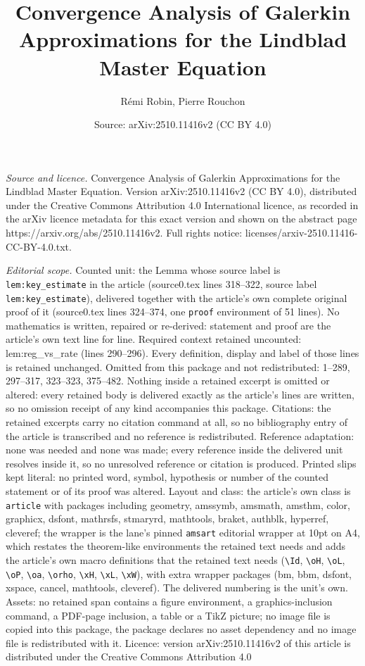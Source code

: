 \documentclass[10pt,a4paper]{amsart}
\title[Convergence Analysis of Galerkin Approximations for the Lind]{Convergence Analysis of Galerkin Approximations for the Lindblad Master Equation}
\author{R\'emi Robin, Pierre Rouchon}
\date{Source: arXiv:2510.11416v2 (CC BY 4.0)}
\begin{document}
\maketitle

\noindent\emph{Source and licence.} Convergence Analysis of Galerkin Approximations for the Lindblad Master Equation. Version arXiv:2510.11416v2 (CC BY 4.0), distributed under the Creative Commons Attribution 4.0 International licence, as recorded in the arXiv licence metadata for this exact version and shown on the abstract page https://arxiv.org/abs/2510.11416v2. Full rights notice: licenses/arxiv-2510.11416-CC-BY-4.0.txt.\par\smallskip

\noindent\textit{Editorial scope.} Counted unit: the Lemma whose source label is \texttt{lem:key\_estimate} in the article (source0.tex lines 318--322, source label \texttt{lem:key\_estimate}), delivered together with the article's own complete original proof of it (source0.tex lines 324--374, one \texttt{proof} environment of 51 lines). No mathematics is written, repaired or re-derived: statement and proof are the article's own text line for line. Required context retained uncounted: lem:reg\_vs\_rate (lines 290--296). Every definition, display and label of those lines is retained unchanged. Omitted from this package and not redistributed: 1--289, 297--317, 323--323, 375--482. Nothing inside a retained excerpt is omitted or altered: every retained body is delivered exactly as the article's lines are written, so no omission receipt of any kind accompanies this package. Citations: the retained excerpts carry no citation command at all, so no bibliography entry of the article is transcribed and no reference is redistributed. Reference adaptation: none was needed and none was made; every reference inside the delivered unit resolves inside it, so no unresolved reference or citation is produced. Printed slips kept literal: no printed word, symbol, hypothesis or number of the counted statement or of its proof was altered. Layout and class: the article's own class is \texttt{article} with packages including geometry, amssymb, amsmath, amsthm, color, graphicx, dsfont, mathrsfs, stmaryrd, mathtools, braket, authblk, hyperref, cleveref; the wrapper is the lane's pinned \texttt{amsart} editorial wrapper at 10pt on A4, which restates the theorem-like environments the retained text needs and adds the article's own macro definitions that the retained text needs (\texttt{\textbackslash Id}, \texttt{\textbackslash oH}, \texttt{\textbackslash oL}, \texttt{\textbackslash oP}, \texttt{\textbackslash oa}, \texttt{\textbackslash orho}, \texttt{\textbackslash xH}, \texttt{\textbackslash xL}, \texttt{\textbackslash xW}), with extra wrapper packages (bm, bbm, dsfont, xspace, cancel, mathtools, cleveref). The delivered numbering is the unit's own. Assets: no retained span contains a figure environment, a graphics-inclusion command, a PDF-page inclusion, a table or a TikZ picture; no image file is copied into this package, the package declares no asset dependency and no image file is redistributed with it. Licence: version arXiv:2510.11416v2 of this article is distributed under the Creative Commons Attribution 4.0 
\end{document}
